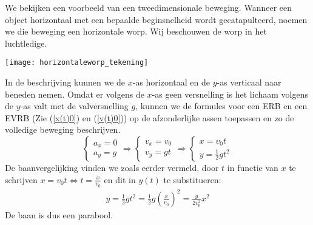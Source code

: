 \documentclass{ximera}
\begin{document}
	\author{Bart Lambregs}
    \xmsource





	We bekijken een voorbeeld van een tweedimensionale beweging. Wanneer een object horizontaal met een bepaalde beginsnelheid wordt gecatapulteerd, noemen we die beweging een horizontale worp. Wij beschouwen de worp in het luchtledige.
	\begin{image}
	
	\texttt{[image: horizontaleworp\_tekening]}
	\end{image}
	In de beschrijving kunnen we de $x$-as horizontaal en de $y$-as verticaal naar beneden nemen. Omdat er volgens de $x$-as geen versnelling is het lichaam volgens de $y$-as valt met de valversnelling $g$, kunnen we de formules voor een ERB en een EVRB (Zie (\ref{x(t)0}) en (\ref{v(t)0})) op de afzonderlijke assen toepassen en zo de volledige beweging beschrijven.%
	\begin{equation*}
	\left\{
	\begin{array}{l}
	a_x=0\\
	a_y=g
	\end{array}
	\right.
	\Rightarrow
	\left\{
	\begin{array}{l}
	v_x=v_0\\
	v_y=gt
	\end{array}
	\right.
	\Rightarrow
	\left\{
	\begin{array}{l}
	x=v_0t\\
	y=\frac{1}{2}gt^2
	\end{array}
	\right.
	\end{equation*}
	De baanvergelijking vinden we zoals eerder vermeld, door $t$ in functie van $x$ te schrijven $x=v_0t\Leftrightarrow t=\frac{x}{v_0}$ en dit in $y(t)$ te substitueren:
	\begin{eqnarray*}
	y=\frac{1}{2}gt^2=\frac{1}{2}g\left(\frac{x}{v_0}\right)^2=\frac{g}{2v_0^2}x^2
	\end{eqnarray*}
	De baan is dus een parabool.
	
\end{document}
